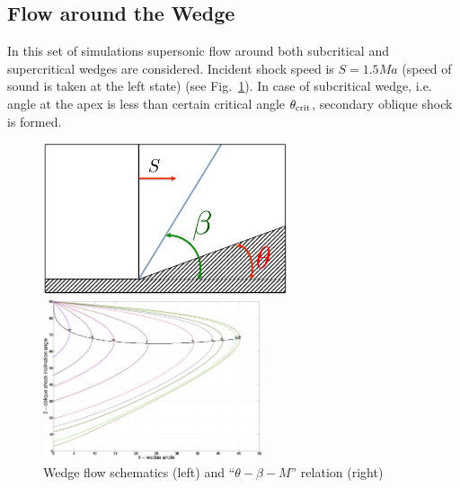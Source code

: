 \subsection{Flow around the Wedge}
In this set of simulations supersonic flow around both subcritical and supercritical wedges are considered. Incident shock speed is $S = 1.5Ma$ (speed of sound is taken at the left state) (see Fig.~\ref{fig:wedge}). In case of subcritical wedge, i.e. angle at the apex is less than certain critical angle $\theta_{\textmd{crit}}$, secondary oblique shock is formed. 
\begin{figure}[t!]
\begin{minipage}{0.5\linewidth}
\centering \includegraphics[height=4.5cm]{fig/wedge_scheme.pdf}
\end{minipage}
\begin{minipage}{0.5\linewidth}
\centering \includegraphics[height=4.7cm]{fig/th-b-m2.png}
\end{minipage}
\caption{Wedge flow schematics (left) and ``$\theta-\beta-M$'' relation (right)} \label{fig:wedge}
\end{figure}
